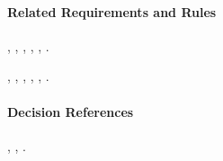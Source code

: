 \paragraph{Related Requirements and Rules}
\hyperref[fr:053]{}, \hyperref[fr:054]{}, \hyperref[fr:059]{}, \hyperref[fr:060]{}, \hyperref[fr:061]{}, \hyperref[fr:062]{}.

\hyperref[br:012]{}, \hyperref[br:034]{}, \hyperref[br:035]{}, \hyperref[br:036]{}, \hyperref[br:040]{}, \hyperref[br:044]{}.

\paragraph{Decision References}
, , .
